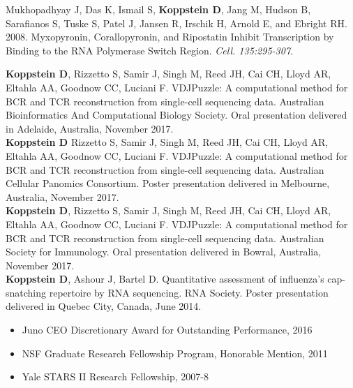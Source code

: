 \documentclass[10pt,a4paper]{article}
\begin{document}
{{{\noindent Mukhopadhyay J, Das K, Ismail S, \textbf{Koppstein D}, Jang M, Hudson B, Sarafianos S, Tuske S, Patel J, Jansen R, Irschik H, Arnold E, and Ebright RH. 2008. Myxopyronin, Corallopyronin, and Ripostatin Inhibit Transcription by Binding to the RNA Polymerase Switch Region. \textit{Cell. 135:295-307.}} \vspace{0.3em} \\

\spacedhrule{-0.4em}{-0.5em}  %


{\noindent \textbf{Koppstein D}, Rizzetto S, Samir J, Singh M, Reed JH, Cai CH, Lloyd AR, Eltahla AA, Goodnow CC, Luciani F. VDJPuzzle: A computational method for BCR and TCR reconstruction from single-cell sequencing data. Australian Bioinformatics And Computational Biology Society. Oral presentation delivered in Adelaide, Australia, November 2017.} \vspace{-0.8em} \\

{\noindent \textbf{Koppstein D} Rizzetto S, Samir J, Singh M, Reed JH, Cai CH, Lloyd AR, Eltahla AA, Goodnow CC, Luciani F. VDJPuzzle: A computational method for BCR and TCR reconstruction from single-cell sequencing data. Australian Cellular Panomics Consortium. Poster presentation delivered in Melbourne, Australia, November 2017.} \vspace{-0.8em} \\

{\noindent \textbf{Koppstein D}, Rizzetto S, Samir J, Singh M, Reed JH, Cai CH, Lloyd AR, Eltahla AA, Goodnow CC, Luciani F. VDJPuzzle: A computational method for BCR and TCR reconstruction from single-cell sequencing data. Australian Society for Immunology. Oral presentation delivered in Bowral, Australia, November 2017.} \vspace{-0.8em} \\

{\noindent \textbf{Koppstein D}, Ashour J, Bartel D. Quantitative assessment of influenza's cap-snatching repertoire by RNA sequencing. RNA Society. Poster presentation delivered in Quebec City, Canada, June 2014.}

\spacedhrule{0.4em}{-0.6em}  %


\begin{itemize}
\item Juno CEO Discretionary Award for Outstanding Performance, 2016
\item NSF Graduate Research Fellowship Program, Honorable Mention, 2011
\item Yale STARS II Research Fellowship, 2007-8
\end{itemize}

}}
\end{document}
